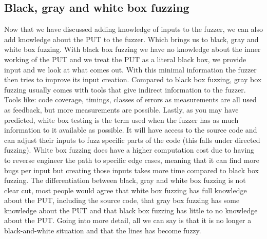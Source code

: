 \subsection{Black, gray and white box fuzzing}
\label{cha:2:BlackGrayWhiteFuzzing}
Now that we have discussed adding knowledge of inputs to the fuzzer, we can also add knowledge about the PUT to the fuzzer. Which brings us to black, gray and white box fuzzing. With black box fuzzing we have no knowledge about the inner working of the PUT and we treat the PUT as a literal black box, we provide input and we look at what comes out. With this minimal information the fuzzer then tries to improve its input creation. Compared to black box fuzzing, gray box fuzzing usually comes with tools that give indirect information to the fuzzer. Tools like: code coverage, timings, classes of errors as measurements are all used as feedback, but more measurements are possible. Lastly, as you may have predicted, white box testing is the term used when the fuzzer has as much information to it available as possible. It will have access to the source code and can adjust their inputs to fuzz specific parts of the code (this falls under directed fuzzing). White box fuzzing does have a higher computation cost due to having to reverse engineer the path to specific edge cases, meaning that it can find more bugs per input but creating those inputs takes more time compared to black box fuzzing. The differentiation between black, gray and white box fuzzing is not clear cut, most people would agree that white box fuzzing has full knowledge about the PUT, including the source code, that gray box fuzzing has some knowledge about the PUT and that black box fuzzing has little to no knowledge about the PUT. Going into more detail, all we can say is that it is no longer a black-and-white situation and that the lines has become fuzzy. 


